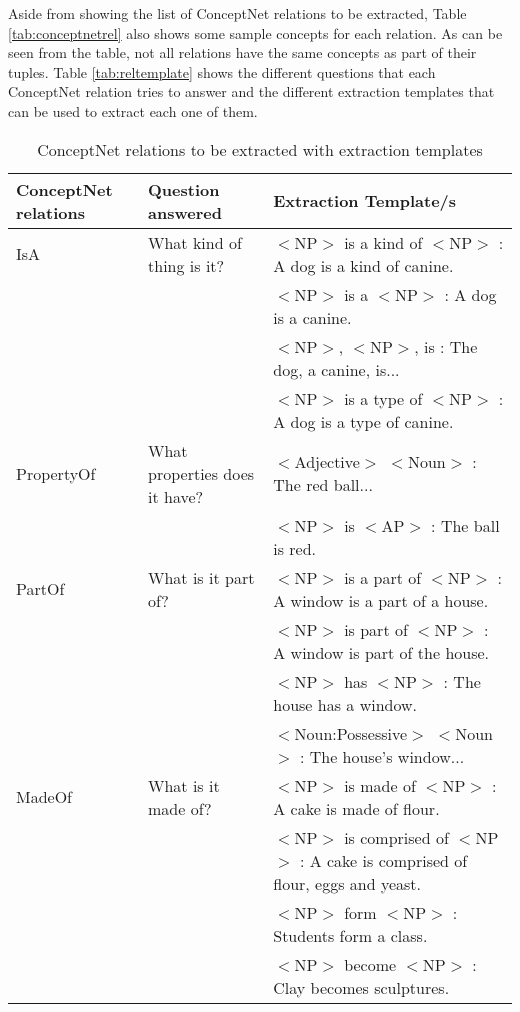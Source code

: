 Aside from showing the list of ConceptNet relations to be extracted, Table \ref{tab:conceptnetrel} also shows some sample concepts for each relation. As can be seen from the table, not all relations have the same concepts as part of their tuples. Table \ref{tab:reltemplate} shows the different questions that each ConceptNet relation tries to answer and the different extraction templates that can be used to extract each one of them.

\begin{table}[p]   %
\centering
\caption{ConceptNet relations \protect \cite{Liu:2004b} to be extracted with extraction templates} \vspace{0.25em}
\begin{tabular}{|p{2cm}|p{3cm}|p{9cm}|} \hline
ConceptNet relations & Question answered & Extraction Template/s \\ \hline
IsA				& What kind of thing is it? & $<$NP$>$ is a kind of $<$NP$>$ : A dog is a kind of canine. \\
				& & $<$NP$>$ is a $<$NP$>$ : A dog is a canine. \\
				& & $<$NP$>$, $<$NP$>$, is : The dog, a canine, is... \\ 
				& & $<$NP$>$ is a type of $<$NP$>$ : A dog is a type of canine. \\ \hline
PropertyOf		& What properties does it have? & $<$Adjective$>$ $<$Noun$>$ : The red ball... \\
				& & $<$NP$>$ is $<$AP$>$ : The ball is red. \\ \hline
PartOf			& What is it part of? & $<$NP$>$ is a part of $<$NP$>$ : A window is a part of a house. \\
				& & $<$NP$>$ is part of $<$NP$>$ : A window is part of the house. \\
				& & $<$NP$>$ has $<$NP$>$ : The house has a window. \\
				& & $<$Noun:Possessive$>$ $<$Noun$>$ : The house's window... \\ \hline
MadeOf			& What is it made of? & $<$NP$>$ is made of $<$NP$>$ : A cake is made of flour. \\
				& & $<$NP$>$ is comprised of $<$NP$>$ : A cake is comprised of flour, eggs and yeast. \\
				& & $<$NP$>$ form $<$NP$>$ : Students form a class. \\
				& & $<$NP$>$ become $<$NP$>$ : Clay becomes sculptures. \\ \hline

\end{tabular}
\end{table}
